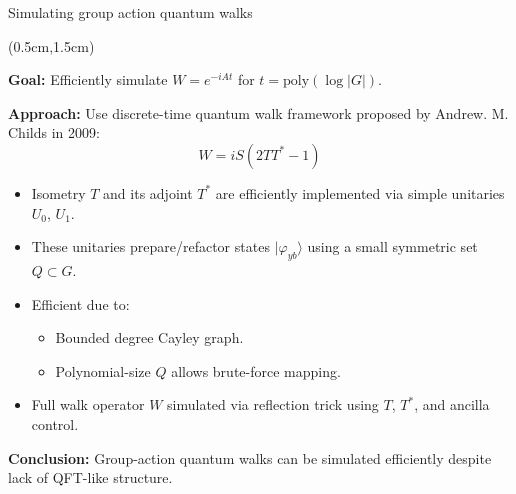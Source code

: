 \documentclass{beamer}
\theoremstyle{definition}
\begin{document}
\begin{frame}{Simulating group action quantum walks}
    
    \begin{textblock*}{12cm}(0.5cm,1.5cm)

                
        \textbf{Goal:} Efficiently simulate $W = e^{-iAt}$ for $t = \text{poly}(\log |G|)$.

        \medskip
        \textbf{Approach:} Use discrete-time quantum walk framework proposed by Andrew. M. Childs in 2009:
        \[
        W = iS(2TT^* - 1)
        \]

        \begin{itemize}
        \item Isometry $T$ and its adjoint $T^*$ are efficiently implemented via simple unitaries $U_0$, $U_1$.
        \item These unitaries prepare/refactor states $|\varphi_{yb}\rangle$ using a small symmetric set $Q \subset G$.
        \item Efficient due to:
            \begin{itemize}
            \item Bounded degree Cayley graph.
            \item Polynomial-size $Q$ allows brute-force mapping.
            \end{itemize}
        \item Full walk operator $W$ simulated via reflection trick using $T$, $T^*$, and ancilla control.
        \end{itemize}

        \textbf{Conclusion:} Group-action quantum walks can be simulated efficiently despite lack of QFT-like structure.


       

    \end{textblock*}

\end{frame}
\end{document}
